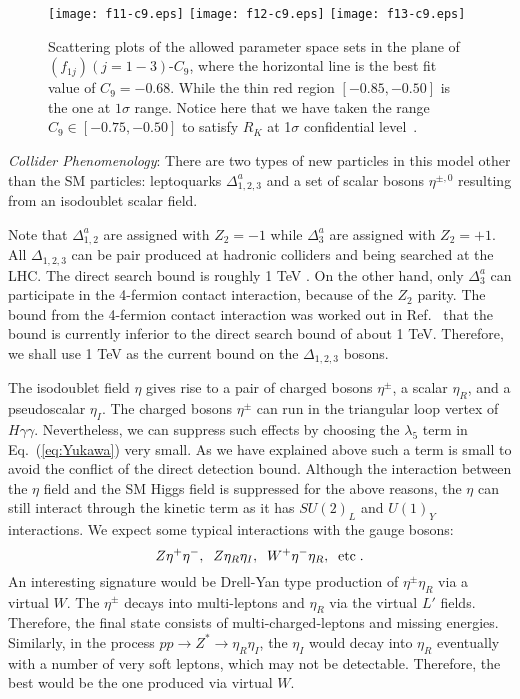 \documentclass[%
showkeys,12pt,
preprint,preprintnumbers,nofootinbib,
groupedaddress,superscriptaddress,amsmath,amssymb]{revtex4}
\numberwithin{equation}{section}
\begin{document}
\begin{figure}[tb]
\begin{center}
\texttt{[image: f11-c9.eps]}
\texttt{[image: f12-c9.eps]}
\texttt{[image: f13-c9.eps]}
\caption{
Scattering {\it} plots of the allowed parameter space sets
in the plane of $(f_{1j})(j=1-3)$-$C_{9}$, where the horizontal line is the best fit value of $C_9=-0.68$.
While  the thin red region $ [-0.85,-0.50]$ is the one at $1\sigma$ range.
Notice here that  we have taken the range $C_9\in [-0.75,-0.50]$ to satisfy $R_K$ at 1$\sigma$ confidential level~\cite{Descotes-Genon:2015uva}.
}
\label{fig:nums-2}
\end{center}
\end{figure}


{\it Collider Phenomenology}: There are two types of new particles in this 
model other than the SM particles: leptoquarks $\Delta_{1,2,3}^a$ and
a set of scalar bosons  $\eta^{\pm,0}$ resulting from an isodoublet scalar field.

Note that $\Delta_{1,2}^a$ are assigned with $Z_2=-1$ while
$\Delta_{3}^a$ are assigned with $Z_2=+1$. All $\Delta_{1,2,3}$ can be
pair produced at hadronic colliders and being searched at the LHC. 
The direct search bound is roughly 1 TeV \cite{lhc-lq}. 
On the other hand, only $\Delta_3^a$ can participate in the
 4-fermion contact interaction, because of the $Z_2$ parity. 
% 
The bound from the 4-fermion contact interaction was worked out in 
Ref.~\cite{Cheung:2016frv,Cheung:2016fjo} that the bound is currently
inferior to the direct search bound of about 1 TeV.  Therefore, we shall
use 1 TeV as the current bound on the $\Delta_{1,2,3}$ bosons.

The isodoublet field $\eta$ gives rise to a pair of  charged bosons
$\eta^\pm$, a scalar $\eta_R$, and a pseudoscalar $\eta_I$.  The charged 
bosons $\eta^\pm$ can run in the triangular loop vertex of $H\gamma\gamma$.
Nevertheless, we can suppress such effects by choosing the $\lambda_5$ term
in Eq.~(\ref{eq:Yukawa}) very small. As we have explained above such a term
is small to avoid the conflict of the direct detection bound.
Although the interaction between the $\eta$ field and the SM Higgs field is 
suppressed for the above reasons, the $\eta$ can still interact through
the kinetic term as it has $SU(2)_L$ and $U(1)_Y$ interactions. 
We expect some typical interactions with the gauge bosons:
\[
  Z \eta^+ \eta^-, \;\; Z \eta_R \eta_I, \;\; W^+ \eta^- \eta_R, \;\;
{\rm etc}\;.
\]
An interesting signature would be Drell-Yan type production
of $\eta^\pm \eta_R$ via a virtual $W$. The $\eta^\pm$ decays into 
multi-leptons and $\eta_R$ via the virtual $L'$ fields. Therefore, 
the final state consists of multi-charged-leptons and missing energies.
Similarly, in the process $pp \to Z^* \to \eta_R \eta_I$, the $\eta_I$
would decay into $\eta_R$ eventually with a number of very soft leptons,
which may not be detectable. Therefore, the best would be the one 
produced via virtual $W$.
\end{document}
